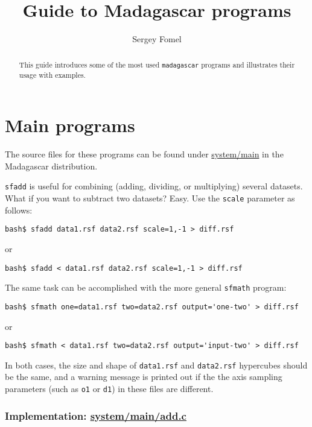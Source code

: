 \title{Guide to Madagascar programs}
\author{Sergey Fomel}

\maketitle

\begin{abstract}

This guide introduces some of the most used \texttt{madagascar} programs and illustrates their
usage with examples.

\end{abstract}

\section{Main programs}

The source files for these programs can be found under
\href{http://rsf.svn.sourceforge.net/viewvc/rsf/trunk/system/main/}{system/main}
in the Madagascar distribution.

\noindent\doublebox{\parbox{\textwidth}{

}}

\texttt{sfadd} is useful for combining (adding, dividing, or
multiplying) several datasets. What if you want to subtract two
datasets? Easy. Use the \texttt{scale} parameter as follows:
\begin{verbatim}
bash$ sfadd data1.rsf data2.rsf scale=1,-1 > diff.rsf
\end{verbatim}
or
\begin{verbatim}
bash$ sfadd < data1.rsf data2.rsf scale=1,-1 > diff.rsf
\end{verbatim}
The same task can be accomplished with the more general \texttt{sfmath} program:
\begin{verbatim}
bash$ sfmath one=data1.rsf two=data2.rsf output='one-two' > diff.rsf
\end{verbatim}
or
\begin{verbatim}
bash$ sfmath < data1.rsf two=data2.rsf output='input-two' > diff.rsf
\end{verbatim}
In both cases, the size and shape of \texttt{data1.rsf} and
\texttt{data2.rsf} hypercubes should be the same, and a warning
message is printed out if the the axis sampling parameters (such as
\texttt{o1} or \texttt{d1}) in these files are different.

\subsubsection{Implementation: \href{http://rsf.svn.sourceforge.net/viewvc/rsf/trunk/system/main/add.c?view=markup}{system/main/add.c}}

